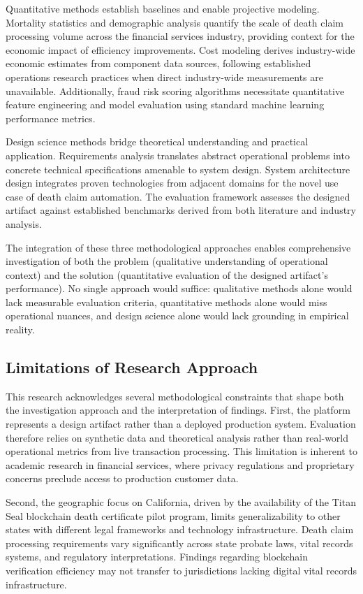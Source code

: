 Quantitative methods establish baselines and enable projective modeling. Mortality statistics and demographic analysis quantify the scale of death claim processing volume across the financial services industry, providing context for the economic impact of efficiency improvements. Cost modeling derives industry-wide economic estimates from component data sources, following established operations research practices when direct industry-wide measurements are unavailable. Additionally, fraud risk scoring algorithms necessitate quantitative feature engineering and model evaluation using standard machine learning performance metrics.

Design science methods bridge theoretical understanding and practical application. Requirements analysis translates abstract operational problems into concrete technical specifications amenable to system design. System architecture design integrates proven technologies from adjacent domains for the novel use case of death claim automation. The evaluation framework assesses the designed artifact against established benchmarks derived from both literature and industry analysis.

The integration of these three methodological approaches enables comprehensive investigation of both the problem (qualitative understanding of operational context) and the solution (quantitative evaluation of the designed artifact's performance). No single approach would suffice: qualitative methods alone would lack measurable evaluation criteria, quantitative methods alone would miss operational nuances, and design science alone would lack grounding in empirical reality.

\subsection{Limitations of Research Approach}

This research acknowledges several methodological constraints that shape both the investigation approach and the interpretation of findings. First, the platform represents a design artifact rather than a deployed production system. Evaluation therefore relies on synthetic data and theoretical analysis rather than real-world operational metrics from live transaction processing. This limitation is inherent to academic research in financial services, where privacy regulations and proprietary concerns preclude access to production customer data.

Second, the geographic focus on California, driven by the availability of the Titan Seal blockchain death certificate pilot program, limits generalizability to other states with different legal frameworks and technology infrastructure. Death claim processing requirements vary significantly across state probate laws, vital records systems, and regulatory interpretations. Findings regarding blockchain verification efficiency may not transfer to jurisdictions lacking digital vital records infrastructure.

